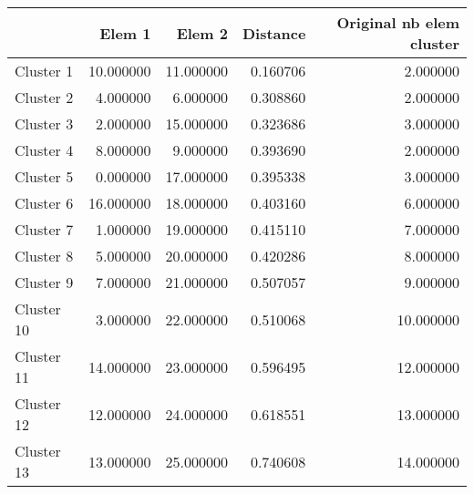 \begin{tabular}{lrrrr}
\toprule
 & Elem 1 & Elem 2 & Distance & Original nb elem cluster \\
\midrule
Cluster 1 & 10.000000 & 11.000000 & 0.160706 & 2.000000 \\
Cluster 2 & 4.000000 & 6.000000 & 0.308860 & 2.000000 \\
Cluster 3 & 2.000000 & 15.000000 & 0.323686 & 3.000000 \\
Cluster 4 & 8.000000 & 9.000000 & 0.393690 & 2.000000 \\
Cluster 5 & 0.000000 & 17.000000 & 0.395338 & 3.000000 \\
Cluster 6 & 16.000000 & 18.000000 & 0.403160 & 6.000000 \\
Cluster 7 & 1.000000 & 19.000000 & 0.415110 & 7.000000 \\
Cluster 8 & 5.000000 & 20.000000 & 0.420286 & 8.000000 \\
Cluster 9 & 7.000000 & 21.000000 & 0.507057 & 9.000000 \\
Cluster 10 & 3.000000 & 22.000000 & 0.510068 & 10.000000 \\
Cluster 11 & 14.000000 & 23.000000 & 0.596495 & 12.000000 \\
Cluster 12 & 12.000000 & 24.000000 & 0.618551 & 13.000000 \\
Cluster 13 & 13.000000 & 25.000000 & 0.740608 & 14.000000 \\
\bottomrule
\end{tabular}
